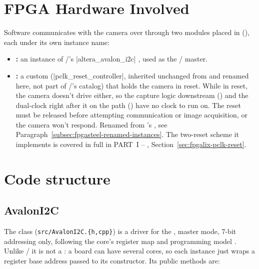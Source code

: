 \section{FPGA Hardware Involved}
\label{sec:fpgasteel-i2c-hardware}

Software communicates with the camera over  through two modules placed in  (), each under its own instance name:

\begin{itemize}
    \item \textbf{:} an instance of /'s |altera_avalon_i2c| , used as the / master.
    \item \textbf{:} a custom  (|pclk_reset_controller|, inherited unchanged from  and renamed here, not part of /'s  catalog) that holds the camera in reset. While in reset, the camera doesn't drive  either, so the capture logic downstream () and the dual-clock  right after it on the  path () have no clock to run on. The reset must be released before attempting  communication or image acquisition, or the camera won't respond. Renamed from 's , see Paragraph~\ref{subsec:fpgasteel-renamed-instances}. The two-reset scheme it implements is covered in full in PART~I -- , Section~\ref{sec:fpgalix-pclk-reset}.
\end{itemize}

\section{Code structure}
\label{sec:fpgasteel-i2c-code-structure}

\subsection{AvalonI2C}
\label{subsec:fpgasteel-i2c-avaloni2c}

The  class (\lstinline[style=inlineFsRepo]!src/AvalonI2C.{h,cpp}!) is a  driver for the  , master mode, 7-bit addressing only, following the core's register map and programming model \cite[Chapter 15, Section 15.5, Section 15.7.6, Figure 54]{EP-IPUG}. Unlike / it is not a : a board can have several  cores, so each instance just wraps a register base address passed to its constructor. Its public methods are:

